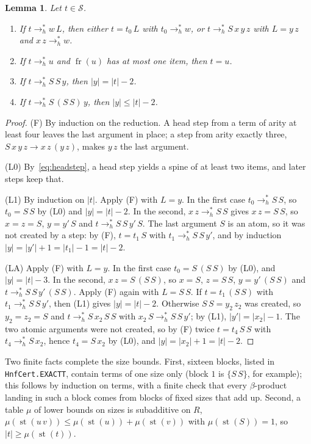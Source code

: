 \documentclass[11pt]{amsart}
\newtheorem{lemma}[theorem]{Lemma}
\theoremstyle{definition}
\theoremstyle{remark}
\newcommand{\spine}{\operatorname{fr}}
\newcommand{\lean}[1]{\texttt{#1}}
\newcommand{\hred}{\to_{h}^{*}}
\newcommand{\sz}[1]{|#1|}
\newcommand{\st}{\operatorname{st}}
\begin{document}
\begin{lemma}\label{lem:laws}
Let $t\in\mathcal S$.
\begin{enumerate}
\item[(F)] If $t\hred w\,L$, then either $t=t_0\,L$ with $t_0\hred w$, or
  $t\hred S\,x\,y\,z$ with $L=y\,z$ and $x\,z\hred w$.
\item[(L0)] If $t\hred u$ and $\spine(u)$ has at most one item, then $t=u$.
\item[(L1)] If $t\hred S\,S\,y$, then $\sz y=\sz t-2$.
\item[(LA)] If $t\hred S\,(S\,S)\,y$, then $\sz y\le\sz t-2$.
\end{enumerate}
\end{lemma}
\begin{proof}
(F) By induction on the reduction. A head step from a term of arity at least four leaves
the last argument in place; a step from arity exactly three, $S\,x\,y\,z\to x\,z\,(y\,z)$,
makes $y\,z$ the last argument.

(L0) By~\eqref{eq:headstep}, a head step yields a spine of at least two items, and
later steps keep that.

(L1) By induction on $\sz t$. Apply (F) with $L=y$. In the first case $t_0\hred S\,S$, so
$t_0=S\,S$ by (L0) and $\sz y=\sz t-2$. In the second, $x\,z\hred S\,S$ gives $x\,z=S\,S$,
so $x=z=S$, $y=y'\,S$ and $t\hred S\,S\,y'\,S$. The last argument $S$ is an atom, so it
was not created by a step: by (F), $t=t_1\,S$ with $t_1\hred S\,S\,y'$, and by induction
$\sz y=\sz{y'}+1=\sz{t_1}-1=\sz t-2$.

(LA) Apply (F) with $L=y$. In the first case $t_0=S\,(S\,S)$ by (L0), and
$\sz y=\sz t-3$. In the second, $x\,z=S\,(S\,S)$, so $x=S$, $z=S\,S$, $y=y'\,(S\,S)$ and
$t\hred S\,S\,y'\,(S\,S)$. Apply (F) again with $L=S\,S$. If $t=t_1\,(S\,S)$ with
$t_1\hred S\,S\,y'$, then (L1) gives $\sz y=\sz t-2$. Otherwise $S\,S=y_2\,z_2$ was created,
so $y_2=z_2=S$ and $t\hred S\,x_2\,S\,S$ with $x_2\,S\hred S\,S\,y'$; by (L1),
$\sz{y'}=\sz{x_2}-1$. The two atomic arguments were not created, so by (F) twice
$t=t_4\,S\,S$ with $t_4\hred S\,x_2$, hence $t_4=S\,x_2$ by (L0), and
$\sz y=\sz{x_2}+1=\sz t-2$.
\end{proof}

Two finite facts complete the size bounds. First, sixteen blocks, listed in
\lean{HnfCert.EXACTT}, contain terms of one size only (block $1$ is $\{S\,S\}$, for example);
this follows by induction on terms, with a finite check that every $\beta$-product landing in
such a block comes from blocks of fixed sizes that add up. Second, a table $\mu$ of lower bounds on
sizes is subadditive on $R$, $\mu(\st(u\,v))\le\mu(\st(u))+\mu(\st(v))$ with $\mu(\st(S))=1$,
so $\sz t\ge\mu(\st(t))$.
\end{document}
